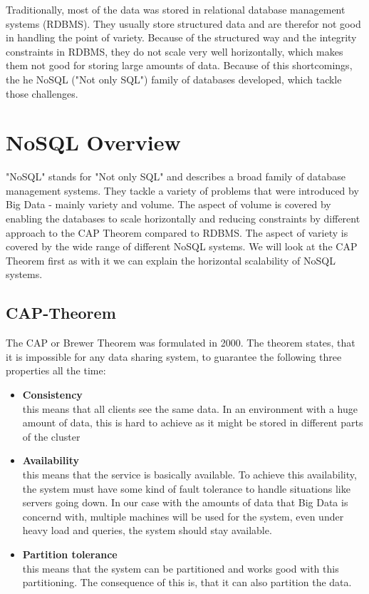 \documentclass{acm_proc_article-sp}
\begin{document}
Traditionally, most of the data was stored in relational database management systems (RDBMS). They usually store structured data and are therefor not good in handling the point of variety. Because of the structured way and the integrity constraints in RDBMS, they do not scale very well horizontally, which makes them not good for storing large amounts of data. Because of this shortcomings, the he NoSQL ("Not only SQL") family of databases developed, which tackle those challenges.

\section{NoSQL Overview}

"NoSQL" stands for "Not only SQL" and describes a broad family of database management systems. They tackle a variety of problems that were introduced by Big Data - mainly variety and volume. The aspect of volume is covered by enabling the databases to scale horizontally and reducing constraints by different approach to the CAP Theorem compared to RDBMS. The aspect of variety is covered by the wide range of different NoSQL systems. We will look at the CAP Theorem first as with it we can explain the horizontal scalability of NoSQL systems.

\subsection{CAP-Theorem}

The CAP or Brewer Theorem\cite{Gilbert:2002:BCF:564585.564601} was formulated in 2000. The  theorem  states, that it is impossible for any data sharing system, to guarantee the following three properties all the time:

\begin{itemize}
	\item \textbf{Consistency} \\ this means that all clients see the same data. In an environment with a huge amount of data, this is hard to achieve as it might be stored in different parts of the cluster
	\item \textbf{Availability} \\ this means that the service is basically available. To achieve this availability, the system must have some kind of fault tolerance to handle situations like servers going down. In our case with the amounts of data that Big Data is concernd with, multiple machines will be used for the system, even under heavy load and queries, the system should stay available.
	\item \textbf{Partition tolerance} \\ this means that the system can be partitioned and works good with this partitioning. The consequence of this is, that it can also partition the data.
\end{itemize}
\end{document}
